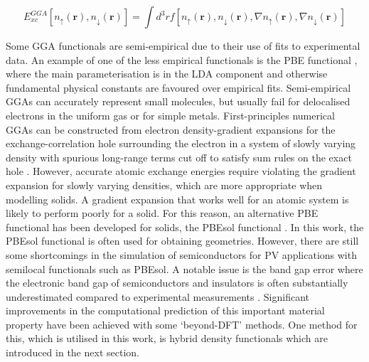 \documentclass[11pt, twoside]{report}
\begin{document}

\begin{equation}\label{GGA}
E_{xc}^{GGA}[ n_{\uparrow}(\mathbf{r}), n_{\downarrow}(\mathbf{r})] = \int d^3r f [ n_{\uparrow}(\mathbf{r}), n_{\downarrow}(\mathbf{r}), \nabla n_{\uparrow}(\mathbf{r}), \nabla n_{\downarrow}(\mathbf{r})]
\end{equation}

Some GGA functionals are semi-empirical due to their use of fits to experimental data. An example of one of the less empirical functionals is the PBE functional \cite{PBE}, where the main parameterisation is in the LDA component and otherwise fundamental physical constants are favoured over empirical fits.
Semi-empirical GGAs can accurately represent small molecules, but usually fail for delocalised electrons in the uniform gas or for simple metals. First-principles numerical GGAs can be constructed from electron density-gradient expansions for the exchange-correlation hole surrounding the electron in a system of slowly varying density with spurious long-range terms cut off to satisfy sum rules on the exact hole \cite{PBE}.
However, accurate atomic exchange energies require violating the gradient expansion for slowly varying densities, which are more appropriate when modelling solids. A gradient expansion that works well for an atomic system is likely to perform poorly for a solid. For this reason, an alternative PBE functional has been developed for solids, the PBEsol functional \cite{PBEsol}. In this work, the PBEsol functional is often used for obtaining geometries. However, there are still some shortcomings in the simulation of semiconductors for PV applications with semilocal functionals such as PBEsol. A notable issue is the band gap error where the electronic band gap of semiconductors and insulators is often substantially underestimated compared to experimental measurements \cite{band_gap_error}. Significant improvements in the computational prediction of this important material property have been achieved with some `beyond-DFT' methods. One method for this, which is utilised in this work, is hybrid density functionals which are introduced in the next section.

\end{document}
